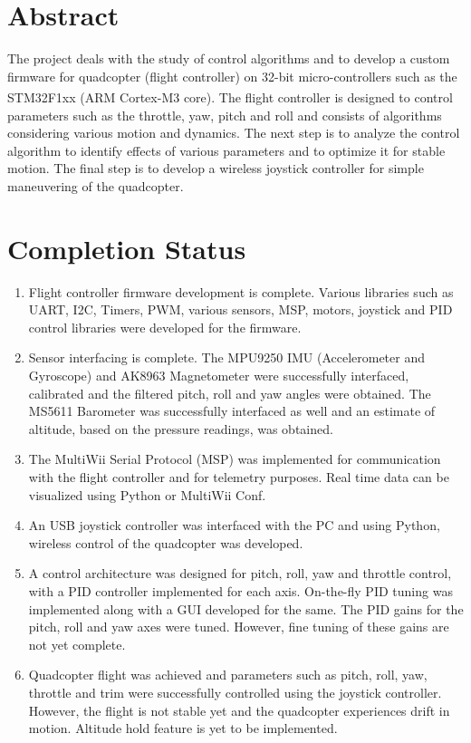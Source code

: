 \documentclass[a4paper,12pt,oneside]{book}
\begin{document}
\section{Abstract}
The project deals with the study of control algorithms and to develop a custom firmware for quadcopter (flight controller) on 32-bit micro-controllers such as the STM32F1xx (ARM\textsuperscript{\textregistered} Cortex\textsuperscript{\textregistered}-M3 core). The flight controller is designed to control parameters such as the throttle, yaw, pitch and roll and consists of algorithms considering various motion and dynamics. The next step is to analyze the control algorithm to identify effects of various parameters and to optimize it for stable motion. The final step is to develop a wireless joystick controller for simple maneuvering of the quadcopter. 

\section{Completion Status}
\begin{enumerate}
\item Flight controller firmware development is complete. Various libraries such as UART, I2C, Timers, PWM, various sensors, MSP, motors, joystick and PID control libraries were developed for the firmware.

\item Sensor interfacing is complete. The MPU9250 IMU (Accelerometer and Gyroscope) and AK8963 Magnetometer were successfully interfaced, calibrated and the filtered pitch, roll and yaw angles were obtained. The MS5611 Barometer was successfully interfaced as well and an estimate of altitude, based on the pressure readings, was obtained.

\item The MultiWii Serial Protocol (MSP) was implemented for communication with the flight controller and for telemetry purposes. Real time data can be visualized using Python or MultiWii Conf.

\item An USB joystick controller was interfaced with the PC and using Python, wireless control of the quadcopter was developed.

\item A control architecture was designed for pitch, roll, yaw and throttle  control, with a PID controller implemented for each axis. On-the-fly PID tuning was implemented along with a GUI developed for the same. The PID gains for the pitch, roll and yaw axes were tuned. However, fine tuning of these gains are not yet complete.

\item Quadcopter flight was achieved and parameters such as pitch, roll, yaw, throttle and trim were successfully controlled using the joystick controller. However, the flight is not stable yet and the quadcopter experiences drift in motion. Altitude hold feature is yet to be implemented.\\
\end{enumerate}
\end{document}
